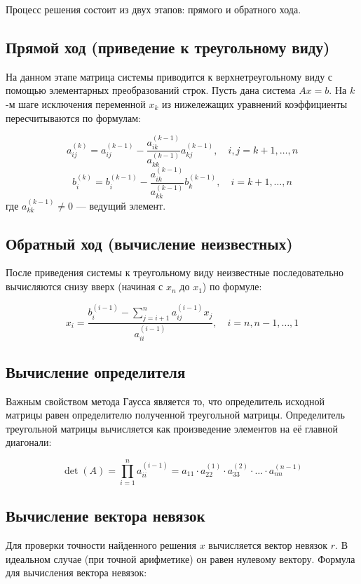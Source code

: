 \documentclass[a4paper,12pt]{article}
\begin{document}
Процесс решения состоит из двух этапов: прямого и обратного хода.

\subsection*{Прямой ход (приведение к треугольному виду)}
На данном этапе матрица системы приводится к верхнетреугольному виду с помощью элементарных преобразований строк. Пусть дана система $Ax = b$. На $k$-м шаге исключения переменной $x_k$ из нижележащих уравнений коэффициенты пересчитываются по формулам:

\begin{equation}
    a_{ij}^{(k)} = a_{ij}^{(k-1)} - \frac{a_{ik}^{(k-1)}}{a_{kk}^{(k-1)}} a_{kj}^{(k-1)}, \quad i,j = k+1, \dots, n
\end{equation}
\begin{equation}
    b_i^{(k)} = b_i^{(k-1)} - \frac{a_{ik}^{(k-1)}}{a_{kk}^{(k-1)}} b_k^{(k-1)}, \quad i = k+1, \dots, n
\end{equation}
где $a_{kk}^{(k-1)} \neq 0$ — ведущий элемент.

\subsection*{Обратный ход (вычисление неизвестных)}
После приведения системы к треугольному виду неизвестные последовательно вычисляются снизу вверх (начиная с $x_n$ до $x_1$) по формуле:

\begin{equation}
    x_i = \frac{b_i^{(i-1)} - \sum_{j=i+1}^n a_{ij}^{(i-1)}x_j}{a_{ii}^{(i-1)}}, \quad i = n, n-1, \dots, 1
\end{equation}

\subsection*{Вычисление определителя}
Важным свойством метода Гаусса является то, что определитель исходной матрицы равен определителю полученной треугольной матрицы. Определитель треугольной матрицы вычисляется как произведение элементов на её главной диагонали:

\begin{equation}
    \det(A) = \prod_{i=1}^n a_{ii}^{(i-1)} = a_{11} \cdot a_{22}^{(1)} \cdot a_{33}^{(2)} \cdot \dots \cdot a_{nn}^{(n-1)}
\end{equation}

\subsection*{Вычисление вектора невязок}
Для проверки точности найденного решения $x$ вычисляется вектор невязок $r$. В идеальном случае (при точной арифметике) он равен нулевому вектору. Формула для вычисления вектора невязок:
\end{document}
